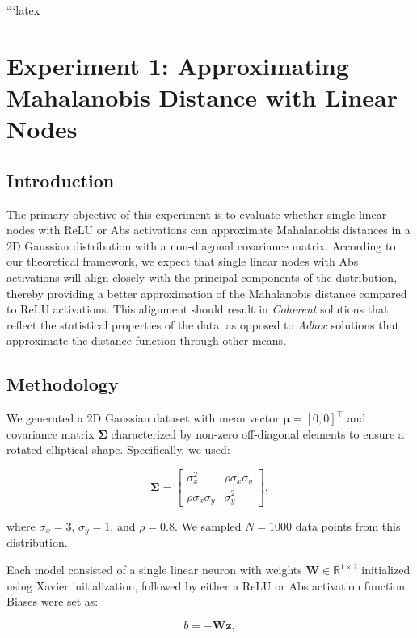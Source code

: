 ```latex
\section{Experiment 1: Approximating Mahalanobis Distance with Linear Nodes}

\subsection{Introduction}

The primary objective of this experiment is to evaluate whether single linear nodes with ReLU or Abs activations can approximate Mahalanobis distances in a 2D Gaussian distribution with a non-diagonal covariance matrix. According to our theoretical framework, we expect that single linear nodes with Abs activations will align closely with the principal components of the distribution, thereby providing a better approximation of the Mahalanobis distance compared to ReLU activations. This alignment should result in \emph{Coherent} solutions that reflect the statistical properties of the data, as opposed to \emph{Adhoc} solutions that approximate the distance function through other means.

\subsection{Methodology}

We generated a 2D Gaussian dataset with mean vector $\boldsymbol{\mu} = [0, 0]^\top$ and covariance matrix $\boldsymbol{\Sigma}$ characterized by non-zero off-diagonal elements to ensure a rotated elliptical shape. Specifically, we used:

\begin{equation}
\label{eq:covariance_matrix}
\boldsymbol{\Sigma} = \begin{bmatrix} \sigma_x^2 & \rho \sigma_x \sigma_y \\ \rho \sigma_x \sigma_y & \sigma_y^2 \end{bmatrix},
\end{equation}

where $\sigma_x = 3$, $\sigma_y = 1$, and $\rho = 0.8$. We sampled $N = 1000$ data points from this distribution.

Each model consisted of a single linear neuron with weights $\mathbf{W} \in \mathbb{R}^{1 \times 2}$ initialized using Xavier initialization, followed by either a ReLU or Abs activation function. Biases were set as:

\begin{equation}
b = -\mathbf{W} \mathbf{z},
\end{equation}

